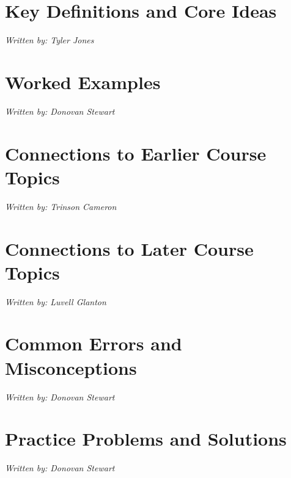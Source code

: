 \documentclass[12pt]{article}
\begin{document}
\newpage
\section{Key Definitions and Core Ideas}
\begin{center}
    \textit{Written by: Tyler Jones}
\end{center}
\vspace{1em}

\newpage
\section{Worked Examples}
\begin{center}
    \textit{Written by: Donovan Stewart}
\end{center}
\vspace{1em}

\newpage
\section{Connections to Earlier Course Topics}
\begin{center}
    \textit{Written by: Trinson Cameron}
\end{center}
\vspace{1em}

\newpage
\section{Connections to Later Course Topics}
\begin{center}
    \textit{Written by: Luvell Glanton}
\end{center}
\vspace{1em}

\newpage
\section{Common Errors and Misconceptions}
\begin{center}
    \textit{Written by: Donovan Stewart}
\end{center}
\vspace{1em}

\newpage
\section{Practice Problems and Solutions}
\begin{center}
    \textit{Written by: Donovan Stewart}
\end{center}
\vspace{1em}
\end{document}

